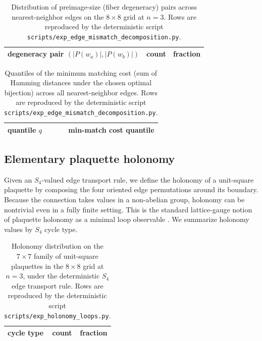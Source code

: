 \begin{table}[t]
\centering
\small
\setlength{\tabcolsep}{6pt}
\renewcommand{\arraystretch}{1.15}
\begin{tabular}{lrr}
\toprule
degeneracy pair $(|P(w_a)|,|P(w_b)|)$ & count & fraction \\
\midrule
%
\end{tabular}
\caption{Distribution of preimage-size (fiber degeneracy) pairs across nearest-neighbor edges on the $8\times 8$ grid at $n=3$. Rows are reproduced by the deterministic script \texttt{scripts/exp\_edge\_mismatch\_decomposition.py}.}
\label{tab:edge_deg_pairs}
\end{table}

\begin{table}[t]
\centering
\small
\setlength{\tabcolsep}{10pt}
\renewcommand{\arraystretch}{1.15}
\begin{tabular}{lr}
\toprule
quantile $q$ & min-match cost quantile \\
\midrule
%
\end{tabular}
\caption{Quantiles of the minimum matching cost (sum of Hamming distances under the chosen optimal bijection) across all nearest-neighbor edges. Rows are reproduced by the deterministic script \texttt{scripts/exp\_edge\_mismatch\_decomposition.py}.}
\label{tab:edge_cost_quantiles}
\end{table}

\subsection{Elementary plaquette holonomy}
\label{subsec:plaquette_holonomy}

Given an $S_4$-valued edge transport rule, we define the holonomy of a unit-square plaquette by composing the four oriented edge permutations around its boundary.
Because the connection takes values in a non-abelian group, holonomy can be nontrivial even in a fully finite setting.
This is the standard lattice-gauge notion of plaquette holonomy as a minimal loop observable \cite{Wilson1974,Rothe2012}.
We summarize holonomy values by $S_4$ cycle type.

\begin{table}[t]
\centering
\small
\setlength{\tabcolsep}{10pt}
\renewcommand{\arraystretch}{1.15}
\begin{tabular}{lrr}
\toprule
cycle type & count & fraction \\
\midrule
%
\end{tabular}
\caption{Holonomy distribution on the $7\times 7$ family of unit-square plaquettes in the $8\times 8$ grid at $n=3$, under the deterministic $S_4$ edge transport rule. Rows are reproduced by the deterministic script \texttt{scripts/exp\_holonomy\_loops.py}.}
\label{tab:holonomy_cycle_types}
\end{table}

